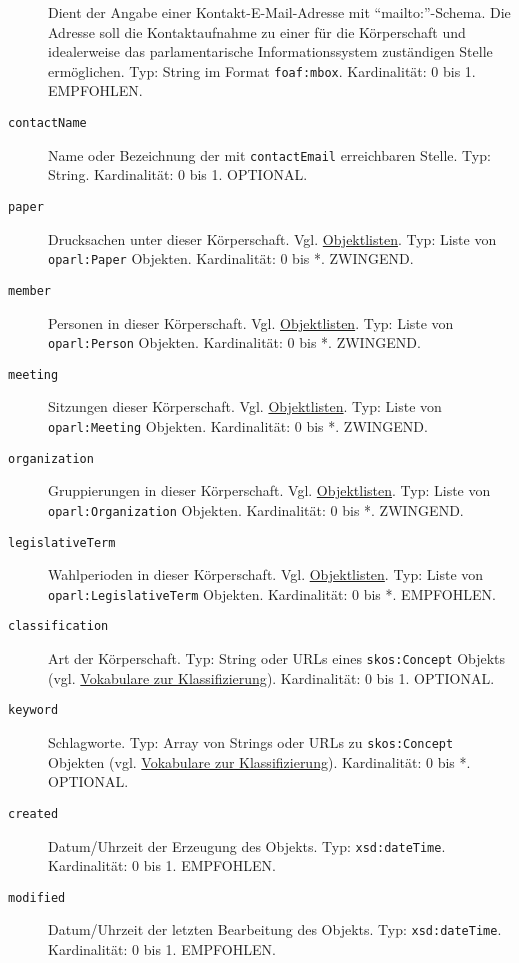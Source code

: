 \documentclass[,a4paper]{article}
\begin{document}
\begin{description}
Dient der Angabe einer Kontakt-E-Mail-Adresse mit ``mailto:''-Schema.
Die Adresse soll die Kontaktaufnahme zu einer für die Körperschaft und
idealerweise das parlamentarische Informationssystem zuständigen Stelle
ermöglichen. Typ: String im Format \texttt{foaf:mbox}. Kardinalität: 0
bis 1. EMPFOHLEN.
\item[\texttt{contactName}]
Name oder Bezeichnung der mit \texttt{contactEmail} erreichbaren Stelle.
Typ: String. Kardinalität: 0 bis 1. OPTIONAL.
\item[\texttt{paper}]
Drucksachen unter dieser Körperschaft. Vgl.
\hyperref[objektlisten]{Objektlisten}. Typ: Liste von
\texttt{oparl:Paper} Objekten. Kardinalität: 0 bis *. ZWINGEND.
\item[\texttt{member}]
Personen in dieser Körperschaft. Vgl.
\hyperref[objektlisten]{Objektlisten}. Typ: Liste von
\texttt{oparl:Person} Objekten. Kardinalität: 0 bis *. ZWINGEND.
\item[\texttt{meeting}]
Sitzungen dieser Körperschaft. Vgl.
\hyperref[objektlisten]{Objektlisten}. Typ: Liste von
\texttt{oparl:Meeting} Objekten. Kardinalität: 0 bis *. ZWINGEND.
\item[\texttt{organization}]
Gruppierungen in dieser Körperschaft. Vgl.
\hyperref[objektlisten]{Objektlisten}. Typ: Liste von
\texttt{oparl:Organization} Objekten. Kardinalität: 0 bis *. ZWINGEND.
\item[\texttt{legislativeTerm}]
Wahlperioden in dieser Körperschaft. Vgl.
\hyperref[objektlisten]{Objektlisten}. Typ: Liste von
\texttt{oparl:LegislativeTerm} Objekten. Kardinalität: 0 bis *.
EMPFOHLEN.
\item[\texttt{classification}]
Art der Körperschaft. Typ: String oder URLs eines \texttt{skos:Concept}
Objekts (vgl. \hyperref[vokabulareux5fklassifizierung]{Vokabulare zur
Klassifizierung}). Kardinalität: 0 bis 1. OPTIONAL.
\item[\texttt{keyword}]
Schlagworte. Typ: Array von Strings oder URLs zu \texttt{skos:Concept}
Objekten (vgl. \hyperref[vokabulareux5fklassifizierung]{Vokabulare zur
Klassifizierung}). Kardinalität: 0 bis *. OPTIONAL.
\item[\texttt{created}]
Datum/Uhrzeit der Erzeugung des Objekts. Typ: \texttt{xsd:dateTime}.
Kardinalität: 0 bis 1. EMPFOHLEN.
\item[\texttt{modified}]
Datum/Uhrzeit der letzten Bearbeitung des Objekts. Typ:
\texttt{xsd:dateTime}. Kardinalität: 0 bis 1. EMPFOHLEN.
\end{description}
\end{document}
